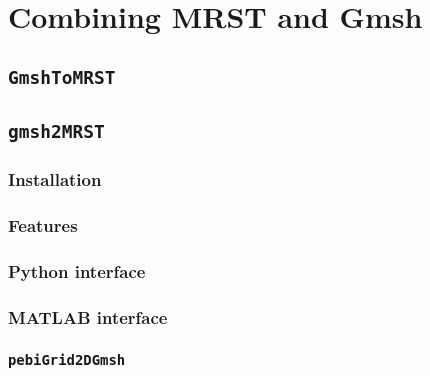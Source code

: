 \section{Combining MRST and Gmsh}
\label{sec:combining}

\subsection{\texttt{GmshToMRST}}

\subsection{\texttt{gmsh2MRST}}

\subsubsection{Installation}

\subsubsection{Features}

\subsubsection{Python interface}

\subsubsection{MATLAB interface}

\subsubsection{\texttt{pebiGrid2DGmsh}}

